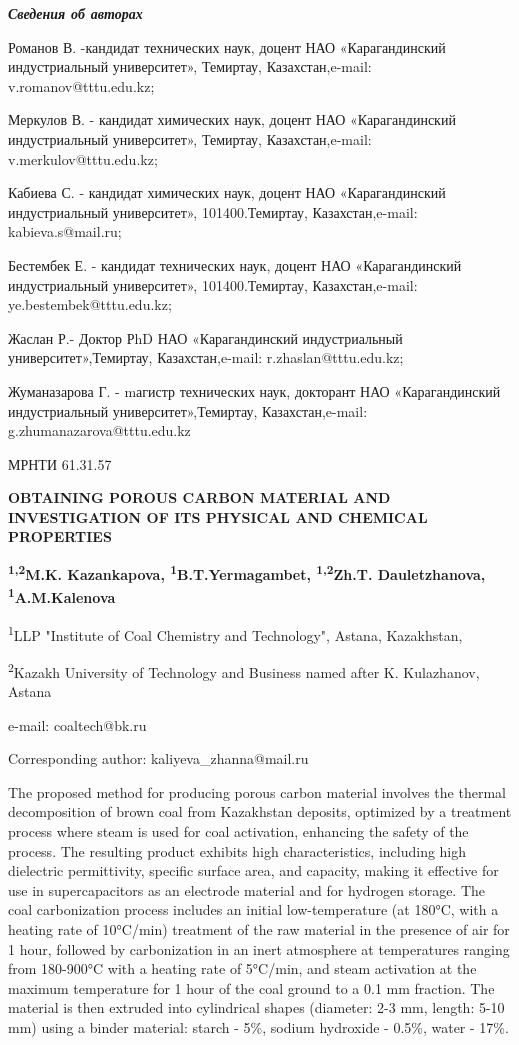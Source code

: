 \emph{\textbf{Сведения об авторах}}

Романов В. -кандидат технических наук, доцент НАО «Карагандинский
индустриальный университет», Темиртау, Казахстан,e-mail:
v.romanov@tttu.edu.kz;

Меркулов В. - кандидат химических наук, доцент НАО «Карагандинский
индустриальный университет», Темиртау, Казахстан,e-mail:
v.merkulov@tttu.edu.kz;

Кабиева С. - кандидат химических наук, доцент НАО «Карагандинский
индустриальный университет», 101400.Темиртау, Казахстан,e-mail:
kabieva.s@mail.ru;

Бестембек Е. - кандидат технических наук, доцент НАО «Карагандинский
индустриальный университет», 101400.Темиртау, Казахстан,e-mail:
ye.bestembek@tttu.edu.kz;

Жаслан Р.- Доктор РhD НАО «Карагандинский индустриальный
университет»,Темиртау, Казахстан,e-mail: r.zhaslan@tttu.edu.kz;

Жуманазарова Г. - mагистр технических наук, докторант НАО
«Карагандинский индустриальный университет»,Темиртау, Казахстан,e-mail:
g.zhumanazarova@tttu.edu.kz

МРНТИ 61.31.57

\textbf{OBTAINING POROUS CARBON MATERIAL AND INVESTIGATION OF ITS
PHYSICAL AND CHEMICAL PROPERTIES}

\textbf{\textsuperscript{1,2}M.K. Kazankapova,
\textsuperscript{1}B.T.Yermagambet, \textsuperscript{1,2}Zh.T.
Dauletzhanova, \textsuperscript{1}A.M.Kalenova}

\textsuperscript{1}LLP "Institute of Coal Chemistry and Technology",
Astana, Kazakhstan,

\textsuperscript{2}Kazakh University of Technology and Business named
after K. Kulazhanov, Astana

e-mail: coaltech@bk.ru

Corresponding author: kaliyeva\_zhanna@mail.ru

The proposed method for producing porous carbon material involves the
thermal decomposition of brown coal from Kazakhstan deposits, optimized
by a treatment process where steam is used for coal activation,
enhancing the safety of the process. The resulting product exhibits high
characteristics, including high dielectric permittivity, specific
surface area, and capacity, making it effective for use in
supercapacitors as an electrode material and for hydrogen storage. The
coal carbonization process includes an initial low-temperature (at
180°C, with a heating rate of 10°C/min) treatment of the raw material in
the presence of air for 1 hour, followed by carbonization in an inert
atmosphere at temperatures ranging from 180-900°C with a heating rate of
5°C/min, and steam activation at the maximum temperature for 1 hour of
the coal ground to a 0.1 mm fraction. The material is then extruded into
cylindrical shapes (diameter: 2-3 mm, length: 5-10 mm) using a binder
material: starch - 5\%, sodium hydroxide - 0.5\%, water - 17\%.

